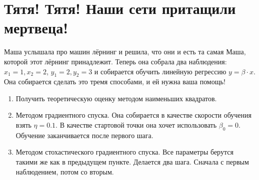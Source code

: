 \documentclass[12pt, a4paper, oneside]{article}
\newcounter{problem}
\renewcommand{\theproblem}{\arabic{problem}}
\newcommand{\problemname}{Задача}
\newenvironment{problem}{
	\addtocounter{problem}{1}\noindent{ \color{myblue} \large\bfseries \problemname{} \theproblem \newline }
}{
	\par\bigskip
}
\begin{document}
	
	
\section*{Тятя! Тятя! Наши сети притащили мертвеца!}

\begin{problem}
	Маша услышала про машин лёрнинг и решила, что они и есть та самая Маша, которой этот лёрнинг принадлежит. Теперь она собрала два наблюдения: $x_1 = 1, x_2 = 2$, $y_1 = 2, y_2 = 3$ и собирается обучить линейную регрессию $y = \beta \cdot x$.  Она собирается сделать это тремя способами, и ей нужна ваша помощь!
	
	\begin{enumerate}
		\item  Получить теоретическую оценку методом наименьших квадратов.
		
		\item  Методом градиентного спуска. Она собирается в качестве скорости обучения взять $\eta = 0.1$.  В качестве стартовой точки она хочет использовать $\beta_0 = 0$. Обучение заканчивается после первого шага.  
		
		\item Методом стохастического градиентного спуска. Все параметры берутся такими же как в предыдущем пункте. Делается два шага. Сначала с первым наблюдением, потом со вторым.
	\end{enumerate}
\end{problem}
\end{document}
